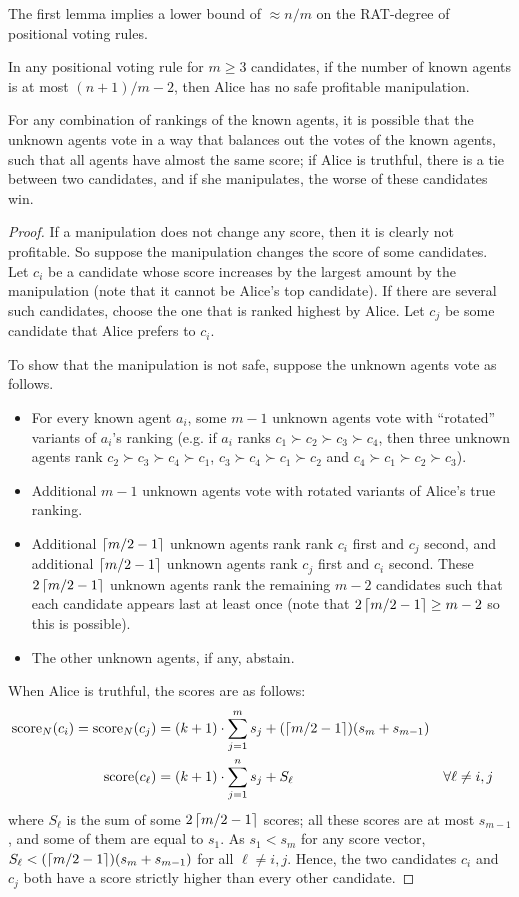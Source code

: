 The first lemma implies a lower bound of $\approx n/m$ on the RAT-degree of positional voting rules.
\begin{lemmarep}
\label{lem:lower-positional}
In any positional voting rule for $m\geq 3$ candidates,
if the number of known agents is at most $(n+1)/m - 2$,
then Alice has no safe profitable manipulation.
\end{lemmarep}
\begin{proofsketch}
For any combination of rankings of the known agents, it is possible that the unknown agents vote in a way that balances out the votes of the known agents, such that all agents have almost the same score; if Alice is truthful, there is a tie between two candidates, and if she manipulates, the worse of these candidates win.
\end{proofsketch}
\begin{proof}
If a manipulation does not change any score, then it is clearly not profitable. So suppose the manipulation changes the score of some candidates. Let $c_i$ be a candidate whose score increases by the largest amount by the manipulation (note that it cannot be Alice's top candidate). If there are several such candidates, choose the one that is ranked highest by Alice. Let $c_j$ be some candidate that Alice prefers to $c_i$.

To show that the manipulation is not safe, suppose the unknown agents vote as follows.
\begin{itemize}
\item For every known agent $a_i$, some $m-1$ unknown agents vote with ``rotated'' variants of $a_i$'s ranking (e.g. if $a_i$ ranks $c_1\succ c_2\succ c_3 \succ c_4$, then three unknown agents rank $c_2\succ c_3 \succ c_4 \succ c_1$,
$c_3 \succ c_4 \succ c_1\succ c_2$ 
and 
$c_4 \succ c_1\succ c_2\succ c_3$).
\item Additional $m-1$ unknown agents vote with rotated variants of Alice's true ranking.

\item Additional $\left\lceil m/2-1 \right\rceil$ unknown agents rank 
rank $c_i$ first and $c_j$ second, 
and additional $\left\lceil m/2-1 \right\rceil$ unknown agents rank $c_j$ first and $c_i$ second. These $2\left\lceil m/2-1 \right\rceil$ unknown agents rank the remaining $m-2$ candidates such that each candidate appears last at least once (note that $2\left\lceil m/2-1 \right\rceil\geq m-2$ so this is possible).
\item The other unknown agents, if any, abstain.
\end{itemize}
When Alice is truthful, the scores are as follows:
\begin{align*}
\operatorname{score}_N(c_i) = \operatorname{score}_N(c_j) &= 
(k+1)\cdot \sum_{j=1}^m s_j + 
(\left\lceil m/2-1 \right\rceil)(s_m+s_{m-1})
\\
\operatorname{score}(c_{\ell}) &= 
(k+1)\cdot \sum_{j=1}^n s_j + 
S_{\ell}
&& \forall \ell\neq i,j
\end{align*}
where $S_{\ell}$ is the sum of some $2\left\lceil m/2-1 \right\rceil$ scores; all these scores are at most $s_{m-1}$, and some of them are equal to $s_1$. As $s_1<s_m$ for any score vector, 
$S_{\ell} < (\left\lceil m/2-1 \right\rceil)(s_m+s_{m-1})$ for all $\ell\neq i,j$. Hence, the two candidates $c_i$ and $c_j$ both have a score strictly higher than every other candidate.


\end{proof}
